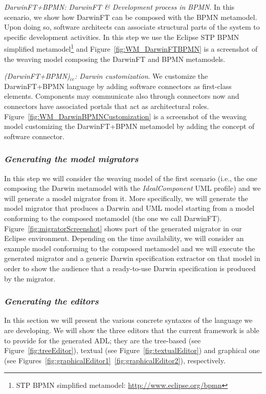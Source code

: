 \noindent \emph{DarwinFT+BPMN: DarwinFT \& Development process in}
\emph{BPMN}. In this scenario, we show how DarwinFT can be composed
with the BPMN metamodel. Upon doing so, software architects can
associate structural parts of the system to specific development
activities. In this step we use the Eclipse STP BPMN simplified metamodel\footnote{STP BPMN simplified metamodel: \underline{http://www.eclipse.org/bpmn}} and
Figure~\ref{fig:WM_DarwinFTBPMN} is a screenshot of the weaving model
composing the DarwinFT and BPMN metamodels.

\noindent \emph{(DarwinFT+BPMN)$_{cc}$: Darwin customization}. We
customize the DarwinFT+BPMN language by adding software connectors
as first-class elements. Components may communicate also through
connectors now and connectors have associated portals that act as
architectural roles.
Figure~\ref{fig:WM_DarwinBPMNCustomization} is a screenshot of the weaving model
customizing the DarwinFT+BPMN metamodel by adding the concept of software connector.

\subsubsection{\em Generating the model migrators}
In this step we will consider the weaving model of the first scenario
(i.e., the one composing the Darwin metamodel with the \textit{IdealComponent} UML profile)
and we will generate a model migrator from it.
More specifically, we will generate the model migrator that produces a Darwin and UML model starting from
a model conforming to the composed metamodel (the one we call DarwinFT).
Figure~\ref{fig:migratorScreenshot} shows part of the generated migrator in our Eclipse
environment.
Depending on the time availability, we will consider an example model conforming to
the composed metamodel and we will execute the generated migrator
and a generic Darwin specification extractor on that model
in order to show the audience that a ready-to-use Darwin specification is produced by the migrator.

\subsubsection{\em Generating the editors}
In this section we will present the various concrete syntaxes of the language
we are developing. We will show the three editors that the current \name{} framework
is able to provide for the generated ADL; they are the tree-based (see Figure~\ref{fig:treeEditor}),
textual (see Figure~\ref{fig:textualEditor}) and graphical one (see Figures~\ref{fig:graphicalEditor1}~\ref{fig:graphicalEditor2}), respectively.

